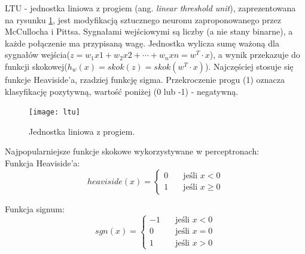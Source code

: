 \documentclass[a4paper,12pt]{article}
\numberwithin{figure}{section}
\begin{document}
    LTU - jednostka liniowa z progiem (ang. \textit{linear threshold unit}), zaprezentowana na rysunku \ref{fig:ltu}, jest modyfikacją sztucznego neuronu zaproponowanego przez McCullocha i Pittsa. Sygnałami wejściowymi są liczby (a nie stany binarne), a każde połączenie ma przypisaną wagę. Jednostka wylicza sumę ważoną dla sygnałów wejścia($z=w_{1}x{1} + w_{2}x{2} + \cdots + w_{n}x{n} = w^{T} \cdot x$), a wynik przekazuje do funkcji skokowej($h_{w}(x) = skok(z) = skok(w^{T} \cdot x)$). Najczęściej stosuje się funkcje Heaviside'a, rzadziej funkcję sigma. Przekroczenie progu (1) oznacza klasyfikację pozytywną, wartość poniżej (0 lub -1) - negatywną\cite{UczenieMaszynowe2018}.

    \bigskip

    \begin{figure}[H]
        \centering
        \texttt{[image: ltu]}
        \caption{Jednostka liniowa z progiem\cite{UczenieMaszynowe2018}.}
        \label{fig:ltu}
    \end{figure}

    \bigskip

    \noindent
    \begin{minipage}[H]{\textwidth}
        \setlength\parindent{17pt} Najpopularniejsze funkcje skokowe wykorzystywane w perceptronach: \\
        \bigskip
        \setlength\parindent{17pt} Funkcja Heaviside'a: \\
        \begin{equation}
            \label{eq:heaviside}
            heaviside(x) =
            \begin{cases}
                0 & \quad \text{jeśli } x < 0 \\
                1 & \quad \text{jeśli } x \geq 0
            \end{cases}
        \end{equation}
    \end{minipage}

    \smallskip

    \noindent
    \begin{minipage}[H]{\textwidth}
        \setlength\parindent{17pt} Funkcja signum: \\
        \begin{equation}
            \label{eq:signum}
            sgn(x) =
            \begin{cases}
                -1 & \quad \text{jeśli } x < 0 \\
                0 & \quad \text{jeśli } x = 0 \\
                1 & \quad \text{jeśli } x > 0
            \end{cases}
        \end{equation}
    \end{minipage}
\end{document}
